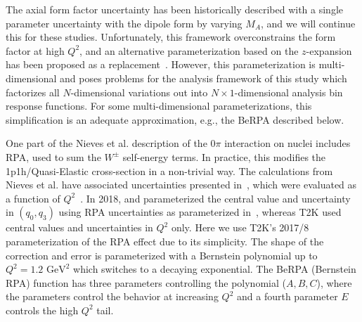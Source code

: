 The axial form factor uncertainty has been historically described with a single parameter uncertainty with the dipole form by varying $M_A$, and we will continue this for these studies.  Unfortunately, this framework overconstrains the form factor at high $Q^2$, and an alternative parameterization based on the $z$-expansion has been proposed as a replacement~\cite{Meyer:2016oeg}.  However, this parameterization is multi-dimensional and poses problems for the analysis framework of this study which factorizes all $N$-dimensional variations out into $N\times{}1$-dimensional analysis bin response functions. For some multi-dimensional parameterizations, this simplification is an adequate approximation, e.g., the BeRPA described below. 

One part of the Nieves et al.\cite{Nieves:2011pp,Gran:2013kda} description of the $0\pi$ interaction on nuclei includes RPA, used to sum the $W^\pm$ self-energy terms. In practice, this modifies the 1p1h/Quasi-Elastic cross-section in a non-trivial way. The calculations from Nieves et al. have associated uncertainties presented in~\cite{nieves_uncert}, 
 which were evaluated as a function of $Q^2$~\cite{sanchez-private}. In 2018, \minerva and \nova parameterized the central value and uncertainty in $(q_0, q_3)$ using RPA uncertainties as parameterized in~\cite{RikRPA}, whereas T2K used central values and uncertainties in $Q^2$ only. Here we use T2K's 2017/8 parameterization of the RPA effect\cite{t2k_2018} 
due to its simplicity. The shape of the correction and error is parameterized with a Bernstein polynomial up to $Q^2=1.2\text{ GeV}^2$ which switches to a decaying exponential. The BeRPA (Bernstein RPA) function has three parameters controlling the polynomial ($A, B, C$), where the parameters control the behavior at increasing $Q^2$ and a fourth parameter $E$ controls the high $Q^2$ tail.

